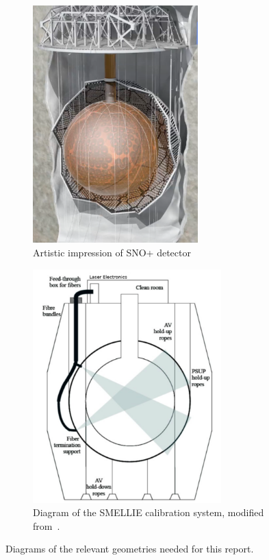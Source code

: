 \begin{figure}
    \centering
    \begin{subfigure}{0.48\textwidth}
        \centering
        \includegraphics[width=0.7\textwidth]{images/detector_picture.png}
        \caption{Artistic impression of SNO+ detector~\cite{}}
        \label{fig:detector_pic}
    \end{subfigure}
    \begin{subfigure}{0.48\textwidth}
        \centering
        \includegraphics[width=0.8\textwidth]{images/SMELLIE_picture_corrected.png}
        \caption{Diagram of the SMELLIE calibration system, modified from~\cite{}.}
        \label{fig:smellie_diagram}
    \end{subfigure}
    \caption{Diagrams of the relevant geometries needed for this report.}
    \label{fig:diagrams}
\end{figure}